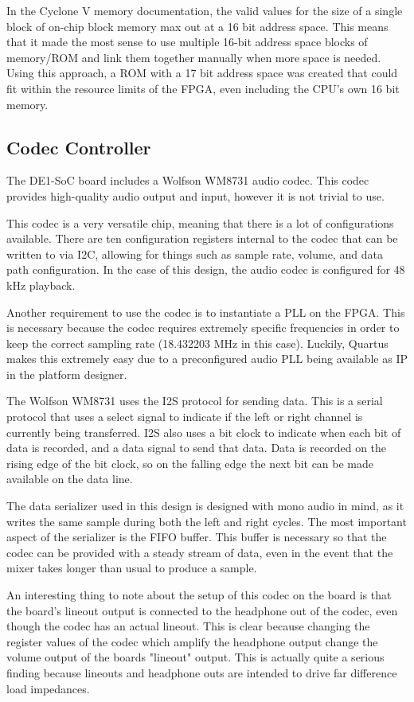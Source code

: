 \documentclass{subfile}
\begin{document}
  In the Cyclone V memory documentation, the valid values for the size of a single block of 
  on-chip block memory max out at a 16 bit address space. \cite{cv_ram}
  This means that it made the most sense to use multiple 16-bit address space blocks of 
  memory/ROM and link them together manually when more space is needed. 
  Using this approach, a ROM with a 17 bit address space was created that could fit within 
  the resource limits of the FPGA, even including the CPU's own 16 bit memory.

  \subsection{Codec Controller} 
  The DE1-SoC board includes a Wolfson WM8731 audio codec. 
  This codec provides high-quality audio output and input, however it is not 
  trivial to use. 

  This codec is a very versatile chip, meaning that there is a lot of configurations 
  available.
  There are ten configuration registers internal to the codec that can be written to via I2C, 
  allowing for things such as sample rate, volume, and data path configuration. \cite{codec}
  In the case of this design, the audio codec is configured for 48 kHz playback.

  Another requirement to use the codec is to instantiate a PLL on the FPGA. 
  This is necessary because the codec requires extremely specific frequencies in order 
  to keep the correct sampling rate (18.432203 MHz in this case).   
  Luckily, Quartus makes this extremely easy due to a preconfigured audio PLL being 
  available as IP in the platform designer.

  The Wolfson WM8731 uses the I2S protocol for sending data.
  This is a serial protocol that uses a select signal to indicate if the left or right 
  channel is currently being transferred.
  I2S also uses a bit clock to indicate when each bit of data is recorded, and a data signal 
  to send that data. 
  Data is recorded on the rising edge of the bit clock, so on the falling edge the 
  next bit can be made available on the data line.

  The data serializer used in this design is designed with mono audio in mind, 
  as it writes the same sample during both the left and right cycles.
  The most important aspect of the serializer is the FIFO buffer. 
  This buffer is necessary so that the codec can be provided with a steady stream of data, 
  even in the event that the mixer takes longer than usual to produce a sample. 

  An interesting thing to note about the setup of this codec on the board is that the 
  board's lineout output is connected to the headphone out of the codec, even though the 
  codec has an actual lineout. 
  This is clear because changing the register values of the codec which amplify the 
  headphone output change the volume output of the boards "lineout" output.
  This is actually quite a serious finding because lineouts and headphone outs 
  are intended to drive far difference load impedances.
\end{document}
